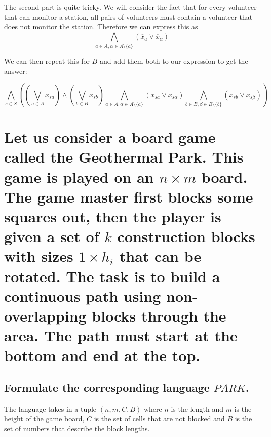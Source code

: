 \documentclass{article}
\begin{document}
	The second part is quite tricky. We will consider the fact that for 
	every volunteer that can monitor a station, all pairs of volunteers 
	must contain a volunteer that does not monitor the station. Therefore 
	we can express this as
	\begin{equation}
		\bigwedge\limits_{a\in A, \alpha\in A\setminus\{a\}} 
		(\overline{x}_{a} \vee \overline{x}_{\alpha})
		\label{eq:gamer1}
	\end{equation}

	We can then repeat this for $B$ and add them both to our expression to 
	get the answer:

	\begin{equation}
		\bigwedge\limits_{s\in S}\left( (\bigvee\limits_{a\in A} x_{sa}) \wedge 
			(\bigvee\limits_{b\in B} x_{sb})
			\bigwedge\limits_{a\in A, \alpha\in A\setminus\{a\}} 
			(\overline{x}_{sa} \vee \overline{x}_{s\alpha})
			\bigwedge\limits_{b\in B, \beta\in B\setminus\{b\}} 
			(\overline{x}_{sb} \vee \overline{x}_{s\beta})\right)
		\label{eq:gamer2}
	\end{equation}

	\newpage
	\section{Let us consider a board game called the Geothermal Park. This 
	game is played on an $n\times m$ board. The game master first blocks 
some squares out, then the player is given a set of $k$ construction blocks 
with sizes $1\times h_i$ that can be rotated. The task is to build a 
continuous path using non-overlapping blocks through the area. The path 
must start at the bottom and end at the top.}

    \subsection{Formulate the corresponding language $PARK$.}
	The language takes in a tuple $(n, m, C, B)$ where $n$ is the length 
	and $m$ is the height of the game board, $C$ is the set of cells that 
	are not blocked and $B$ is the set of numbers that describe the block 
	lengths.
\end{document}
